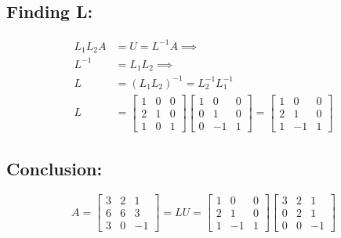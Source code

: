 \documentclass[fleqn]{article}
\begin{document}
\subsection*{Finding L:}
\begin{equation*}
    \begin{split}
    L_{1}L_{2}A &= U = L^{-1}A \implies\\ 
    L^{-1} &= L_{1}L_{2} \implies\\
    L &= (L_{1}L_{2})^{-1} = L_{2}^{-1}L_{1}^{-1} \\
    L &= \begin{bmatrix}1&0&0\\2&1&0\\1&0&1\end{bmatrix}\begin{bmatrix}1&0&0\\0&1&0\\0&-1&1\end{bmatrix} = \begin{bmatrix}1&0&0\\2&1&0\\1&-1&1\end{bmatrix}
    \end{split}
\end{equation*}
\subsection*{Conclusion:}
\begin{equation*}
    A = \begin{bmatrix}3&2&1\\6&6&3\\3&0&-1\end{bmatrix} = LU = \begin{bmatrix}1&0&0\\2&1&0\\1&-1&1\end{bmatrix}\begin{bmatrix}3&2&1\\0&2&1\\0&0&-1\end{bmatrix}
\end{equation*}
\end{document}
